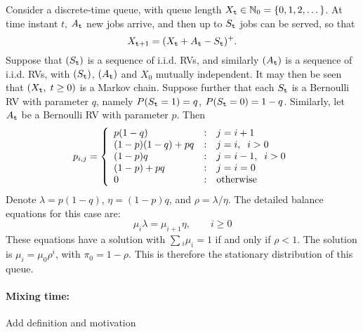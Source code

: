 \begin{example} Consider a discrete-time queue, with queue length $X_{\tt t}\in \mathbb{N}_0=\{0,1,2,\dots\}$. At time instant $t$, ${A_{\tt t}}$ new jobs arrive, and then up to ${S_{\tt t}}$ jobs can be served, so that
\[{X_{{\tt t} +1}} = {({X_{\tt t}} + {A_{\tt t}} - {S_{\tt t}})^ + }.\]
Suppose that $({S_{\tt t}})$ is a sequence of i.i.d. RVs, and
similarly $({A_{\tt t}})$ is a sequence of i.i.d. RVs, with
$({S_{\tt t}})$, $({A_{\tt t}})$ and ${X_0}$ mutually independent. It
may then be seen that $({X_{\tt t}},\;t \ge 0)$ is a Markov chain.
Suppose further that each ${S_{\tt t}}$ is a Bernoulli RV with
parameter $q$, namely $P({S_{\tt t}} = 1) = q$, $P({S_{\tt t}} = 0) =
1 - q$. Similarly, let ${A_{\tt t}}$ be a Bernoulli RV with parameter
$p$. Then
\[{p_{i,j}} = \left\{ {\begin{array}{*{20}{l}}
{p(1 - q)}&:&{j = i + 1}\\
{(1 - p)(1 - q) + pq}&:&{j = i,\;\;i > 0}\\
{(1 - p)q}&:&{j = i - 1,\;\;i > 0}\\
{(1 - p) + pq}&:&{j = i = 0}\\
0&:&{{\rm{otherwise}}}
\end{array}} \right.\]
 Denote $\lambda  = p(1 - q)$, $\eta  = (1 - p)q$, and $\rho  = \lambda /\eta $.   The detailed balance equations for this case are:
\[{\mu _i}\lambda  = {\mu _{i + 1}}\eta ,\quad \quad i \ge 0\]
These equations have a solution with $\sum {_i{\mu _i} = 1}$ if and
only if $\rho  < 1$. The solution is ${\mu _i} = {\mu _0}{\rho ^i}$,
with ${\pi _0} = 1 - \rho $. This is therefore the stationary
distribution of this queue.
\end{example}


\paragraph{Mixing time:} Add definition and motivation
